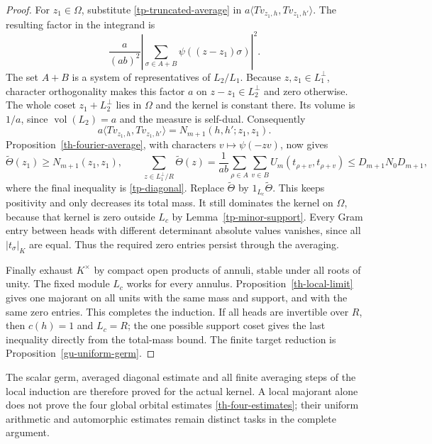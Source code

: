 \begin{proof}
For $z_1\in\Omega$, substitute \eqref{tp-truncated-average}
in $a\langle Tv_{z_1,h},Tv_{z_1,h'}\rangle$. The resulting
factor in the integrand is
\[
 \frac{a}{(ab)^2}
  \left|\sum_{\sigma\in A+B}\psi((z-z_1)\sigma)\right|^2.
\]
The set $A+B$ is a system of representatives of $L_2/L_1$.
Because $z,z_1\in L_1^\perp$, character orthogonality makes
this factor $a$ on $z-z_1\in L_2^\perp$ and zero otherwise.
The whole coset $z_1+L_2^\perp$ lies in $\Omega$ and the
kernel is constant there. Its volume is $1/a$, since
$\operatorname{vol}(L_2)=a$ and the measure is self-dual.
Consequently
\[
 a\langle Tv_{z_1,h},Tv_{z_1,h'}\rangle
                         =N_{m+1}(h,h';z_1,z_1).
\]
Proposition~\ref{th-fourier-average}, with characters
$v\mapsto\psi(-zv)$, now gives
\[
 \widetilde\Theta(z_1)\ge N_{m+1}(z_1,z_1),\qquad
 \sum_{z\in L_1^\perp/R}\widetilde\Theta(z)
   =\frac1{ab}\sum_{\rho\in A}\sum_{v\in B}
                        U_m(t_{\rho+v},t_{\rho+v})
   \le D_{m+1}N_0D_{m+1},
\]
where the final inequality is \eqref{tp-diagonal}.
Replace $\widetilde\Theta$ by $1_{L_c}\widetilde\Theta$.
This keeps positivity and only decreases its total mass.
It still dominates the kernel on $\Omega$, because that
kernel is zero outside $L_c$ by Lemma~\ref{tp-minor-support}.
Every Gram entry between heads with different determinant
absolute values vanishes, since all $|t_\sigma|_K$ are equal.
Thus the required zero entries persist through the averaging.

Finally exhaust $K^\times$ by compact open products of annuli,
stable under all roots of unity. The fixed module $L_c$ works
for every annulus. Proposition~\ref{th-local-limit} gives
one majorant on all units with the same mass and support,
and with the same zero entries. This completes the induction.
If all heads are invertible over $R$, then $c(h)=1$ and
$L_c=R$; the one possible support coset gives the last
inequality directly from the total-mass bound. The finite
target reduction is Proposition~\ref{gu-uniform-germ}.
\end{proof}

The scalar germ, averaged diagonal estimate and all finite
averaging steps of the local induction are therefore proved for
the actual kernel. A local majorant alone does not prove the
four global orbital estimates \eqref{th-four-estimates}; their
uniform arithmetic and automorphic estimates remain distinct
tasks in the complete argument.


